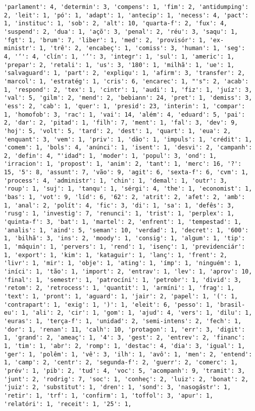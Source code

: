\documentclass[11pt]{article}
\begin{document}
\begin{Verbatim}[commandchars=\\\{\}]
'parlament': 4, 'determin': 3, 'compens': 1, 'fim': 2, 'antidumping': 2, 'leit': 1, 'pó': 1, 'adapt': 1, 'antecip': 1, 'necess': 4, 'pact': 1, 'instituc': 1, 'sob': 2, 'alt': 10, 'quarta-f': 2, 'fux': 4, 'suspend': 2, 'dua': 1, 'açõ': 3, 'penal': 2, 'réu': 3, 'saqu': 1, 'fgt': 1, 'brum': 7, 'liber': 1, 'med': 2, 'provisór': 1, 'ex-ministr': 1, 'trê': 2, 'encabeç': 1, 'comiss': 3, 'human': 1, 'seg': 4, '‘': 4, 'clín': 1, '’': 3, 'integr': 1, 'sul': 1, 'americ': 1, 'prepar': 2, 'retali': 1, 'us': 3, '180': 1, 'milhã': 1, 'ue': 1, 'salvaguard': 1, 'part': 2, 'expliqu': 1, 'afirm': 3, 'transfer': 2, 'marcol': 1, 'estratég': 1, 'cris': 6, 'encarec': 1, "'s": 2, 'acab': 1, 'respond': 2, 'tex': 1, 'cintr': 1, 'audi': 1, 'fiz': 1, 'juíz': 3, 'val': 5, 'gilm': 2, 'mend': 2, 'bebiann': 24, 'pret': 1, 'demiss': 3, 'ess': 2, 'cab': 1, 'quer': 1, 'presid': 23, 'interin': 1, 'compar': 1, 'homofob': 3, 'rac': 1, 'vai': 14, 'além': 4, 'eduard': 5, 'pai': 2, 'dar': 2, 'pitad': 1, 'filh': 7, 'ment': 1, 'fal': 3, 'dev': 9, 'hoj': 5, 'volt': 5, 'tard': 2, 'dest': 1, 'quart': 1, 'eua': 2, 'enquant': 3, 'vem': 1, 'priv': 1, 'dão': 1, 'impuls': 1, 'crédit': 1, 'comem': 1, 'bols': 4, 'anúnci': 1, 'isent': 1, 'desvi': 2, 'campanh': 2, 'defin': 4, "'idad": 1, 'moder': 1, 'popul': 3, 'ond': 1, 'irracion': 1, 'propost': 1, 'anim': 2, 'tant': 1, 'merc': 16, '?': 15, '5': 8, 'assunt': 7, 'vão': 9, 'agit': 6, 'sexta-f': 6, 'cvm': 1, 'process': 4, 'administr': 1, 'chin': 1, 'demal': 1, 'outr': 3, 'roup': 1, 'suj': 1, 'tanqu': 1, 'sérgi': 4, 'the': 1, 'economist': 1, 'bas': 1, 'vot': 9, 'líd': 6, '62': 2, 'atrit': 2, 'afet': 2, 'amb': 1, 'anal': 2, 'polít': 4, 'fic': 3, 'di': 1, 'sa': 1, 'defês': 3, 'rusg': 1, 'investig': 7, 'renunci': 1, 'trist': 1, 'perplex': 1, 'quinta-f': 3, 'bat': 1, 'martel': 2, 'enfrent': 1, 'tempestad': 1, 'analis': 1, 'aind': 5, 'seman': 10, 'verdad': 1, 'decret': 1, '600': 1, 'bilhã': 3, 'ins': 2, 'moody': 1, 'consig': 1, 'algum': 1, 'tip': 1, 'máquin': 1, 'pervers': 1, 'rend': 1, 'isenç': 1, 'previdenciár': 1, 'export': 1, 'kim': 1, 'kataguir': 1, 'lanç': 1, 'frent': 2, 'livr': 1, 'mir': 1, 'obje': 1, 'ating': 1, 'ímp': 1, 'ninguém': 1, 'iníci': 1, 'tão': 1, 'import': 2, 'entrav': 1, 'lev': 1, 'aprov': 10, 'final': 1, 'semestr': 1, 'patrocíni': 1, 'petrobr': 1, 'divid': 3, 'retom': 2, 'retrocess': 1, 'quantit': 1, 'armíni': 1, 'frag': 1, 'text': 1, 'pront': 1, 'aguard': 1, 'jair': 2, 'papel': 1, '(': 1, 'contrapart': 1, 'exig': 1, ')': 1, 'eleit': 6, 'pesso': 1, 'brasil-eu': 1, 'ali': 2, 'cir': 1, 'gom': 1, 'ajud': 4, 'vers': 1, 'dilu': 1, 'euras': 1, 'terça-f': 1, 'unidad': 2, 'semi-intens': 2, 'fech': 1, 'dor': 1, 'renan': 11, 'calh': 10, 'protagon': 1, 'err': 3, 'digit': 1, 'grand': 2, 'ameaç': 1, '4': 3, 'gest': 2, 'entrev': 2, 'financ': 1, 'tim': 1, 'abr': 2, 'romp': 1, 'destac': 4, 'dia': 3, 'igual': 1, 'ger': 1, 'polêm': 1, 'vê': 3, 'ilh': 1, 'avô': 1, 'men': 2, 'entend': 1, 'camp': 2, 'centr': 2, 'segunda-f': 2, 'guerr': 2, 'comerc': 1, 'prév': 1, 'pib': 2, 'tud': 4, 'voc': 5, 'acompanh': 9, 'tramit': 3, 'junt': 2, 'rodrig': 7, 'soc': 1, 'conheç': 2, 'luiz': 2, 'bonat': 2, 'juiz': 2, 'substitut': 1, 'dren': 1, 'sond': 3, 'nasogástr': 1, 'retir': 1, 'trf': 1, 'confirm': 1, 'toffol': 3, 'apur': 1, 'relatóri': 1, 'receit': 1, '25': 1, 
\end{Verbatim}
\end{document}
